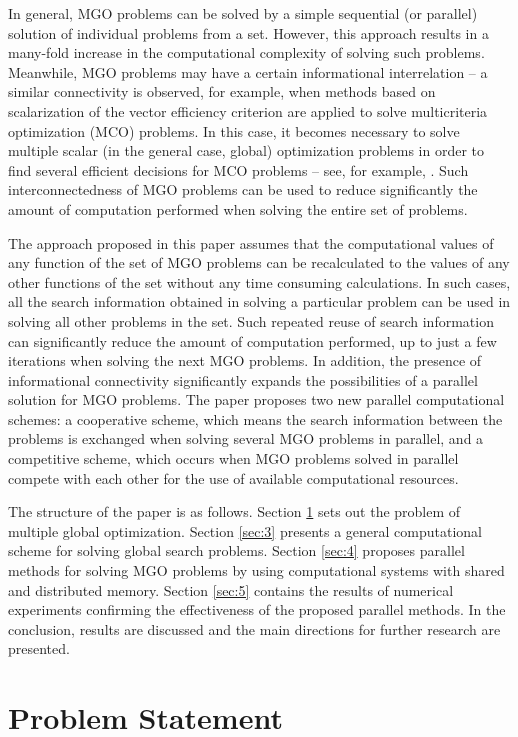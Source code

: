 \documentclass[review]{elsarticle}
\begin{document}
In general, MGO problems can be solved by a simple sequential (or parallel) solution of individual problems from a set. However, this approach results in a many-fold increase in the computational complexity of solving such problems. Meanwhile, MGO problems may have a certain informational interrelation -- a similar connectivity is observed, for example, when methods based on scalarization of the vector efficiency criterion are applied to solve multicriteria optimization (MCO) problems. In this case, it becomes necessary to solve multiple scalar (in the general case, global) optimization problems in order to find several efficient decisions  for MCO problems -- see, for example, \cite{c29,c30,c31,c32,c33}. Such interconnectedness of MGO problems can be used to reduce significantly the amount of computation performed when solving the entire set of problems.

The approach proposed in this paper assumes that the computational values of any function of the set of MGO problems can be recalculated to the values of any other functions of the set without any time consuming calculations. In such cases, all the search information obtained in solving a particular problem can be used in solving all other problems in the set. Such repeated reuse of search information can significantly reduce the amount of computation performed, up to just a few iterations when solving the next MGO problems. In addition, the presence of informational connectivity significantly expands the possibilities of a parallel solution for MGO problems. The paper proposes two new parallel computational schemes: a cooperative scheme, which means the search information between the problems is exchanged when solving several MGO problems in parallel, and a competitive scheme, which occurs when MGO problems solved in parallel compete with each other for the use of available computational resources.

The structure of the paper is as follows. Section \ref{sec:2} sets out the problem of multiple global optimization. Section \ref{sec:3} presents a general computational scheme for solving global search problems. Section \ref{sec:4} proposes parallel methods for solving MGO problems by using computational systems with shared and distributed memory. Section \ref{sec:5} contains the results of numerical experiments confirming the effectiveness of the proposed parallel methods. In the conclusion, results are discussed and the main directions for further research are presented.

\section{Problem Statement}\label{sec:2}
\end{document}
